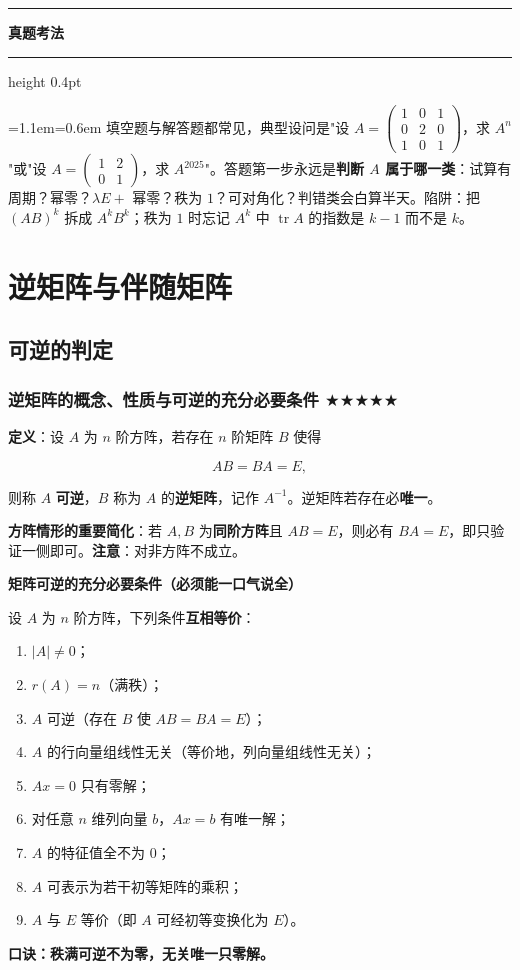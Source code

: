 \documentclass[11pt,openany,UTF8]{ctexbook}
\newcommand{\callouthead}[2]{%
  \par\addvspace{7pt}\noindent
  {\color{#1}\rule[-0.15em]{3pt}{1.05em}}\hspace{0.5em}%
  {\bfseries\color{#1}#2}\par\nobreak\vspace{-0.35em}%
  {\color{rulesep}\hrule height 0.4pt}\nobreak\vspace{0.45em}%
  \begingroup\small\setlength{\parindent}{0pt}%
  \leftskip=1.1em\rightskip=0.6em\noindent\ignorespaces}
\newcommand{\calloutend}{\par\endgroup\addvspace{7pt}}
\newenvironment{callexam}[1]{\callouthead{exambar}{#1}}{\calloutend}
\begin{document}
\begin{callexam}{真题考法}
填空题与解答题都常见，典型设问是"设 $A=\begin{pmatrix}1&0&1\\0&2&0\\1&0&1\end{pmatrix}$，求 $A^n$"或"设 $A=\begin{pmatrix}1&2\\0&1\end{pmatrix}$，求 $A^{2025}$"。答题第一步永远是\textbf{判断 $A$ 属于哪一类}：试算有周期？幂零？$\lambda E+$ 幂零？秩为 $1$？可对角化？判错类会白算半天。陷阱：把 $(AB)^k$ 拆成 $A^kB^k$；秩为 $1$ 时忘记 $A^k$ 中 $\operatorname{tr}A$ 的指数是 $k-1$ 而不是 $k$。

\end{callexam}

\section{逆矩阵与伴随矩阵}

\subsection{可逆的判定}

\subsubsection{逆矩阵的概念、性质与可逆的充分必要条件 $\bigstar$$\bigstar$$\bigstar$$\bigstar$$\bigstar$}

\textbf{定义}：设 $A$ 为 $n$ 阶方阵，若存在 $n$ 阶矩阵 $B$ 使得

\[AB=BA=E,\]

则称 $A$ \textbf{可逆}，$B$ 称为 $A$ 的\textbf{逆矩阵}，记作 $A^{-1}$。逆矩阵若存在必\textbf{唯一}。

\textbf{方阵情形的重要简化}：若 $A,B$ 为\textbf{同阶方阵}且 $AB=E$，则必有 $BA=E$，即只验证一侧即可。\textbf{注意}：对非方阵不成立。

\textbf{矩阵可逆的充分必要条件（必须能一口气说全）}

设 $A$ 为 $n$ 阶方阵，下列条件\textbf{互相等价}：

\begin{enumerate}
\item $\vert A\vert\ne0$；
\item $r(A)=n$（满秩）；
\item $A$ 可逆（存在 $B$ 使 $AB=BA=E$）；
\item $A$ 的行向量组线性无关（等价地，列向量组线性无关）；
\item $Ax=0$ 只有零解；
\item 对任意 $n$ 维列向量 $b$，$Ax=b$ 有唯一解；
\item $A$ 的特征值全不为 $0$；
\item $A$ 可表示为若干初等矩阵的乘积；
\item $A$ 与 $E$ 等价（即 $A$ 可经初等变换化为 $E$）。
\end{enumerate}
\textbf{口诀：秩满可逆不为零，无关唯一只零解。}
\end{document}
